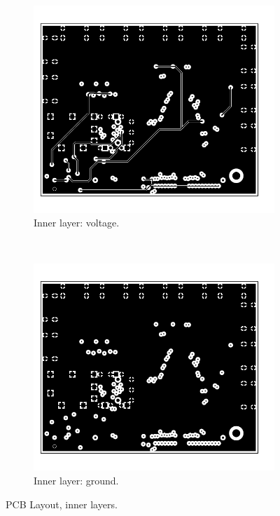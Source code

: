 \documentclass[main.tex]{subfiles}
\begin{document}
\begin{figure}[]
    \centering
    \begin{subfigure}[t]{0.7\textwidth}
        \centering
        \includegraphics[width=\linewidth, angle=0]{../img/pcb_in1}
        \caption{Inner layer: voltage.}
    \end{subfigure}%
    \\
    \begin{subfigure}[t]{0.7\textwidth}
        \centering
        \includegraphics[width=\linewidth, angle=0]{../img/pcb_in2}
        \caption{Inner layer: ground.}
    \end{subfigure}
    \caption{PCB Layout, inner layers.}
    \label{fig:pcb_in}
\end{figure}
\end{document}
